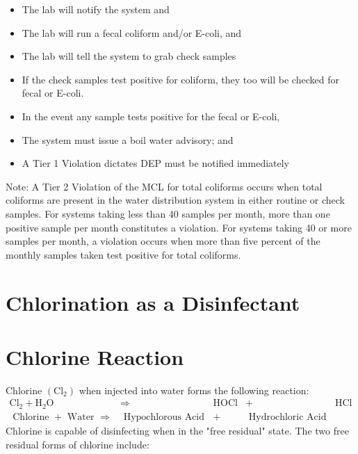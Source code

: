 \documentclass[10pt]{article}
\begin{document}
\begin{itemize}
  \item The lab will notify the system and

  \item The lab will run a fecal coliform and/or E-coli, and

  \item The lab will tell the system to grab check samples

  \item If the check samples test positive for coliform, they too will be checked for fecal or E-coli.

  \item In the event any sample tests positive for the fecal or E-coli,

  \item The system must issue a boil water advisory; and

  \item A Tier 1 Violation dictates DEP must be notified immediately

\end{itemize}
Note: A Tier 2 Violation of the MCL for total coliforms occurs when total coliforms are present in the water distribution system in either routine or check samples. For systems taking less than 40 samples per month, more than one positive sample per month constitutes a violation. For systems taking 40 or more samples per month, a violation occurs when more than five percent of the monthly samples taken test positive for total coliforms.

\section{Chlorination as a Disinfectant}
\section{Chlorine Reaction}
Chlorine $\left(\mathrm{Cl}_{2}\right)$ when injected into water forms the following reaction:
$$
\begin{array}{ccccc}
\mathrm{Cl}_{2}+\mathrm{H}_{2} \mathrm{O} & \Rightarrow & \mathrm{HOCl} & + & \mathrm{HCl} \\
\text { Chlorine }+\text { Water } \Rightarrow & \text { Hypochlorous Acid } & + & \text { Hydrochloric Acid }
\end{array}
$$
Chlorine is capable of disinfecting when in the "free residual" state. The two free residual forms of chlorine include:
\end{document}
